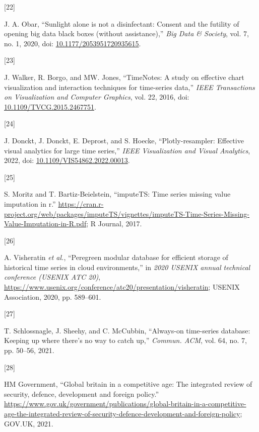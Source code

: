 \documentclass{article}
\newlength{\cslhangindent}
\newlength{\csllabelwidth}
\newlength{\cslentryspacingunit} %
\newenvironment{CSLReferences}[2] %
 {%
  \setlength{\parindent}{0pt}
  \ifodd #1
  \let\oldpar\par
  \def\par{\hangindent=\cslhangindent\oldpar}
  \fi
  \setlength{\parskip}{#2\cslentryspacingunit}
 }%
 {}
\newcommand{\CSLLeftMargin}[1]{\parbox[t]{\csllabelwidth}{#1}}
\newcommand{\CSLRightInline}[1]{\parbox[t]{\linewidth - \csllabelwidth}{#1}\break}
\begin{document}
\begin{CSLReferences}{0}{0}
\leavevmode{}%
\CSLLeftMargin{{[}22{]} }
\CSLRightInline{J. A. Obar, {``Sunlight alone is not a disinfectant:
Consent and the futility of opening big data black boxes (without
assistance),''} \emph{Big Data \& Society}, vol. 7, no. 1, 2020, doi:
\href{https://doi.org/10.1177/2053951720935615}{10.1177/2053951720935615}.}

\leavevmode{}%
\CSLLeftMargin{{[}23{]} }
\CSLRightInline{J. Walker, R. Borgo, and MW. Jones, {``TimeNotes: A
study on effective chart visualization and interaction techniques for
time-series data,''} \emph{IEEE Transactions on Visualization and
Computer Graphics}, vol. 22, 2016, doi:
\href{https://doi.org/10.1109/TVCG.2015.2467751}{10.1109/TVCG.2015.2467751}.}

\leavevmode{}%
\CSLLeftMargin{{[}24{]} }
\CSLRightInline{J. Donckt, J. Donckt, E. Deprost, and S. Hoecke,
{``Plotly-resampler: Effective visual analytics for large time
series,''} \emph{IEEE Visualization and Visual Analytics}, 2022, doi:
\href{https://doi.org/10.1109/VIS54862.2022.00013}{10.1109/VIS54862.2022.00013}.}

\leavevmode{}%
\CSLLeftMargin{{[}25{]} }
\CSLRightInline{S. Moritz and T. Bartiz-Beielstein, {``imputeTS: Time
series missing value imputation in r.''}
\url{https://cran.r-project.org/web/packages/imputeTS/vignettes/imputeTS-Time-Series-Missing-Value-Imputation-in-R.pdf};
R Journal, 2017.}

\leavevmode{}%
\CSLLeftMargin{{[}26{]} }
\CSLRightInline{A. Visheratin \emph{et al.}, {``Peregreen {\textendash}
modular database for efficient storage of historical time series in
cloud environments,''} in \emph{2020 USENIX annual technical conference
(USENIX ATC 20)},
\url{https://www.usenix.org/conference/atc20/presentation/visheratin};
USENIX Association, 2020, pp. 589--601.}

\leavevmode{}%
\CSLLeftMargin{{[}27{]} }
\CSLRightInline{T. Schlossnagle, J. Sheehy, and C. McCubbin,
{``Always-on time-series database: Keeping up where there's no way to
catch up,''} \emph{Commun. ACM}, vol. 64, no. 7, pp. 50--56, 2021.}

\leavevmode{}%
\CSLLeftMargin{{[}28{]} }
\CSLRightInline{HM Government, {``Global britain in a competitive age:
The integrated review of security, defence, development and foreign
policy.''}
\url{https://www.gov.uk/government/publications/global-britain-in-a-competitive-age-the-integrated-review-of-security-defence-development-and-foreign-policy};
GOV.UK, 2021.}


\end{CSLReferences}
\end{document}
